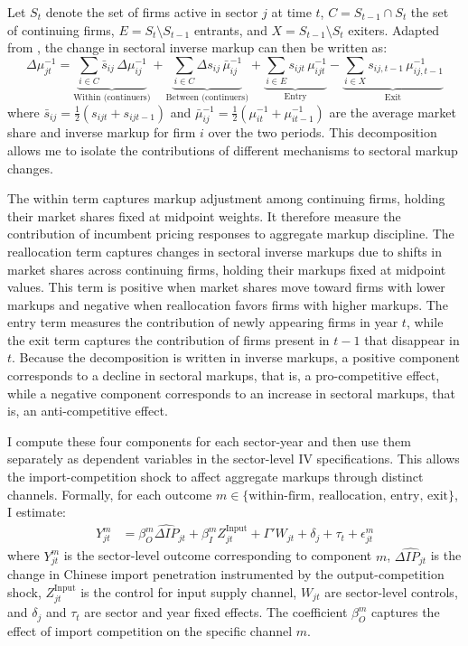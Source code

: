 \documentclass[12pt]{article}
\begin{document}
Let $S_t$ denote the set of firms active in sector $j$ at time $t$, $C = S_{t-1} \cap S_t$ the set of continuing firms, $E = S_t \setminus S_{t-1}$ entrants, and $X = S_{t-1} \setminus S_t$ exiters. Adapted from \textcite{melitzDynamicOlleyPakesProductivity2015}, the change in sectoral inverse markup can then be written as:
\[\Delta \mu_{jt}^{-1}
=
\underbrace{\sum_{i \in C} \bar{s}_{ij}\,\Delta \mu_{ij}^{-1}}_{\text{Within (continuers)}}
+
\underbrace{\sum_{i \in C} \Delta s_{ij}\,\bar{\mu}_{ij}^{-1}}_{\text{Between (continuers)}}
+
\underbrace{\sum_{i \in E} s_{ijt}\,\mu_{ijt}^{-1}}_{\text{Entry}} - \underbrace{\sum_{i \in X} s_{ij,t-1}\,\mu_{ij,t-1}^{-1}}_{\text{Exit}}\]
where $\bar{s}_{ij} = \frac{1}{2}(s_{ijt} + s_{ijt-1})$ and $\bar{\mu}_{ij}^{-1} = \frac{1}{2}(\mu_{it}^{-1} + \mu_{it-1}^{-1})$ are the average market share and inverse markup for firm $i$ over the two periods. This decomposition allows me to isolate the contributions of different mechanisms to sectoral markup changes.

The within term captures markup adjustment among continuing firms, holding their market shares fixed at midpoint weights. It therefore measure the contribution of incumbent pricing responses to aggregate markup discipline. The reallocation term captures changes in sectoral inverse markups due to shifts in market shares across continuing firms, holding their markups fixed at midpoint values. This term is positive when market shares move toward firms with lower markups and negative when reallocation favors firms with higher markups. The entry term measures the contribution of newly appearing firms in year $t$, while the exit term captures the contribution of firms present in $t-1$ that disappear in $t$. Because the decomposition is written in inverse markups, a positive component corresponds to a decline in sectoral markups, that is, a pro-competitive effect, while a negative component corresponds to an increase in sectoral markups, that is, an anti-competitive effect.

I compute these four components for each sector-year and then use them separately as dependent variables in the sector-level IV specifications. This allows the import-competition shock to affect aggregate markups through distinct channels. Formally, for each outcome $m \in \{ \text{within-firm, reallocation, entry, exit} \}$, I estimate: 
\begin{equation}
\begin{aligned}
    Y^m_{jt} &= \beta_O^m \widehat{\Delta IP}_{jt} + \beta_I^m Z_{jt}^{\text{Input}} + \Gamma' W_{jt} + \delta_j + \tau_t + \epsilon_{jt}^m
\end{aligned}
\end{equation}
where $Y^m_{jt}$ is the sector-level outcome corresponding to component $m$, $\widehat{\Delta IP_{jt}}$ is the change in Chinese import penetration instrumented by the output-competition shock, $Z_{jt}^{\text{Input}}$ is the control for input supply channel, $W_{jt}$ are sector-level controls, and $\delta_j$ and $\tau_t$ are sector and year fixed effects. The coefficient $\beta_O^m$ captures the effect of import competition on the specific channel $m$.
\end{document}
